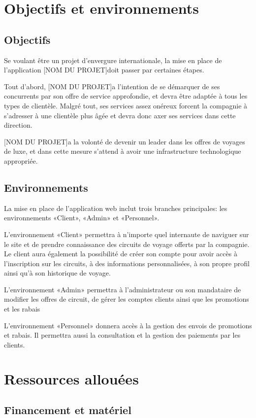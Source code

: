 \documentclass{scrreprt}
\def\projectname{[NOM DU PROJET]}
\begin{document}
\chapter{Objectifs et environnements}
\section{Objectifs}
Se voulant être un projet d'envergure internationale, la mise en place
de l'application \projectname doit passer par certaines étapes.

Tout d'abord, \projectname a l'intention de se démarquer de ses
concurrents par son offre de service approfondie, et devra être adaptée
à tous les types de clientèle. Malgré tout, ses services assez onéreux
forcent la compagnie à s'adresser à une clientèle plus âgée et devra
donc axer ses services dans cette direction.

\projectname a la volonté de devenir un leader dans les offres de
voyages de luxe, et dans cette mesure s'attend à avoir une
infrastructure technologique appropriée.


\section{Environnements}
La mise en place de l'application web inclut trois branches
principales: les environnements «Client», «Admin» et «Personnel».

L'environnement «Client» permettra à n'importe quel internaute de
naviguer sur le site et de prendre connaissance des circuits de voyage
offerts par la compagnie. Le client aura également la possibilité de
créer son compte pour avoir accès à l'inscription sur les circuits, à
des informations personnalisées, à son propre profil ainsi qu'à son
historique de voyage.

L'environnement «Admin» permettra à l'administrateur ou son mandataire
de modifier les offres de circuit, de gérer les comptes clients ainsi
que les promotions et les rabais

L'environnement «Personnel» donnera accès à la gestion des envois de
promotions et rabais. Il permettra aussi la consultation et la gestion
des paiements par les clients.

\chapter{Ressources allouées}
\section{Financement et matériel}
\end{document}
